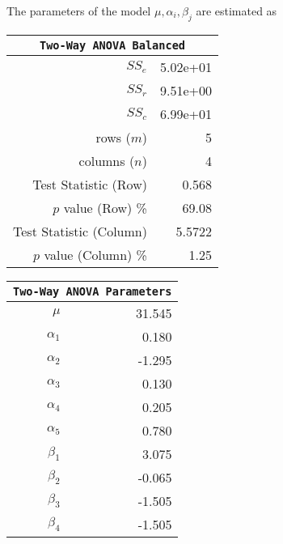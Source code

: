 \begin{enumerate}
	The parameters of the model $ \mu, \alpha_i, \beta_j $ are estimated as
	
	\begin{table}[H]
		\centering
		\begin{minipage}{0.4\textwidth}
			\centering
			\begin{tabular}{@{}rr@{}}
				\toprule
				\multicolumn{2}{c}{\texttt{Two-Way ANOVA Balanced}} \\
				\midrule
				$SS_e$                  &               5.02e+01 \\
				$SS_r$                  &               9.51e+00 \\
				$SS_c$                  &               6.99e+01 \\
				rows ($m$)              &                      5 \\
				columns ($n$)           &                      4 \\
				Test Statistic (Row)    &                  0.568 \\
				$p$ value (Row) \%      &                  69.08 \\
				Test Statistic (Column) &                 5.5722 \\
				$p$ value (Column) \%   &                   1.25 \\
				\bottomrule
			\end{tabular}
		\end{minipage}
		\begin{minipage}{0.4\textwidth}
			\centering
			\begin{tabular}{@{}rr@{}}
				\toprule
				\multicolumn{2}{c}{\texttt{Two-Way ANOVA Parameters}} \\
				\midrule
				$\mu$      &                   31.545 \\
				$\alpha_1$ &                    0.180 \\
				$\alpha_2$ &                   -1.295 \\
				$\alpha_3$ &                    0.130 \\
				$\alpha_4$ &                    0.205 \\
				$\alpha_5$ &                    0.780 \\
				$\beta_1$  &                    3.075 \\
				$\beta_2$  &                   -0.065 \\
				$\beta_3$  &                   -1.505 \\
				$\beta_4$  &                   -1.505 \\
				\bottomrule
			\end{tabular}
		\end{minipage}
	\end{table}
	\bigskip
	

\end{enumerate}
